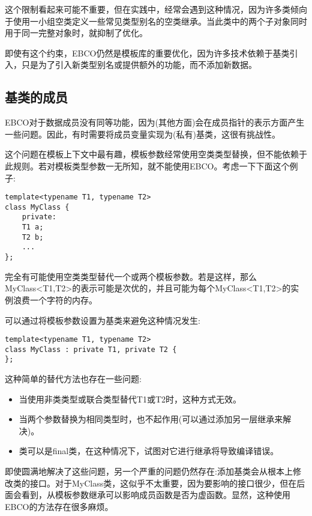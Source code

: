这个限制看起来可能不重要，但在实践中，经常会遇到这种情况，因为许多类倾向于使用一小组空类定义一些常见类型别名的空类继承。当此类中的两个子对象同时用于同一完整对象时，就抑制了优化。

即使有这个约束，EBCO仍然是模板库的重要优化，因为许多技术依赖于基类引入，只是为了引入新类型别名或提供额外的功能，而不添加新数据。

\subsection{基类的成员}

EBCO对于数据成员没有同等功能，因为(其他方面)会在成员指针的表示方面产生一些问题。因此，有时需要将成员变量实现为(私有)基类，这很有挑战性。

这个问题在模板上下文中最有趣，模板参数经常使用空类类型替换，但不能依赖于此规则。若对模板类型参数一无所知，就不能使用EBCO。考虑一下下面这个例子:

\begin{lstlisting}[style=styleCXX]
template<typename T1, typename T2>
class MyClass {
	private:
	T1 a;
	T2 b;
	...
};
\end{lstlisting}

完全有可能使用空类类型替代一个或两个模板参数。若是这样，那么MyClass<T1,T2>的表示可能是次优的，并且可能为每个MyClass<T1,T2>的实例浪费一个字符的内存。

可以通过将模板参数设置为基类来避免这种情况发生:

\begin{lstlisting}[style=styleCXX]
template<typename T1, typename T2>
class MyClass : private T1, private T2 {
};
\end{lstlisting}

这种简单的替代方法也存在一些问题:

\begin{itemize}
\item 
当使用非类类型或联合类型替代T1或T2时，这种方式无效。

\item 
当两个参数替换为相同类型时，也不起作用(可以通过添加另一层继承来解决)。

\item 
类可以是final类，在这种情况下，试图对它进行继承将导致编译错误。
\end{itemize}

即使圆满地解决了这些问题，另一个严重的问题仍然存在:添加基类会从根本上修改类的接口。对于MyClass类，这似乎不太重要，因为要影响的接口很少，但在后面会看到，从模板参数继承可以影响成员函数是否为虚函数。显然，这种使用EBCO的方法存在很多麻烦。

